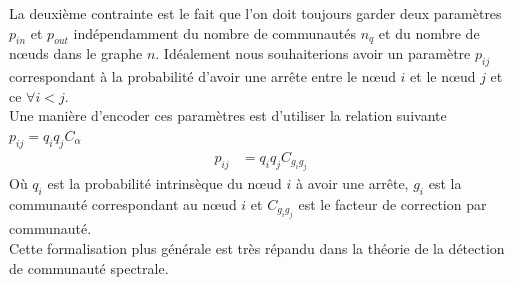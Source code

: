 La deuxième contrainte est le fait que l'on doit toujours garder deux paramètres $p_{in}$ et $p_{out}$ indépendamment du nombre de communautés $n_q$ et du nombre de nœuds dans le graphe $n$.
Idéalement nous souhaiterions avoir un paramètre $p_{ij}$ correspondant à la probabilité d'avoir une arrête entre le nœud $i$ et le nœud $j$ et ce $\forall i<j$.\\
Une manière d'encoder ces paramètres est d'utiliser la relation suivante $p_{ij} = q_iq_jC_{\alpha}$
\begin{align}
	p_{ij} &= q_iq_jC_{g_ig_j}
\end{align}
Où $q_i$ est la probabilité intrinsèque du nœud $i$ à avoir une arrête, $g_i$ est la communauté correspondant au nœud $i$ et $C_{g_ig_j}$ est le facteur de correction par communauté.\\
Cette formalisation plus générale est très répandu dans la théorie de la détection de communauté spectrale.